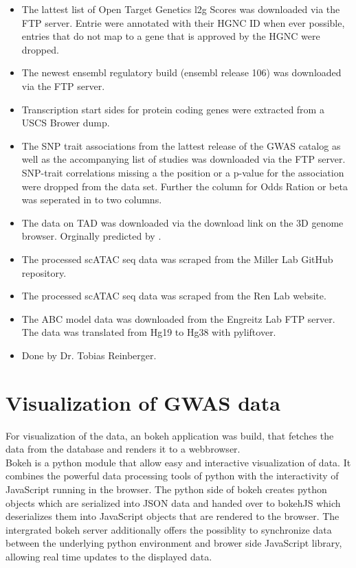 \begin{itemize}
    \item {} The lattest list of Open Target Genetics l2g Scores was downloaded via the FTP server. Entrie were annotated with their HGNC ID when ever possible, entries that do not map to a gene that is approved by the HGNC were dropped.
    \item {} The newest ensembl regulatory build (ensembl release 106) was downloaded via the FTP server.
    \item {} Transcription start sides for protein coding genes were extracted from a USCS Brower dump.
    \item {} The SNP trait associations from the lattest release of the GWAS catalog as well as the accompanying list of studies was downloaded via the FTP server. SNP-trait correlations missing a the position or a p-value for the association were dropped from the data set. Further the column for Odds Ration or beta was seperated in to two columns.
    \item {} The data on TAD was downloaded via the download link on the 3D genome browser. Orginally predicted by \cite{dixonTopologicalDomainsMammalian2012}.
    \item {} The processed scATAC seq data was scraped from the Miller Lab GitHub repository.
    \item {} The processed scATAC seq data was scraped from the Ren Lab website.
    \item {} The ABC model data was downloaded from the Engreitz Lab FTP server. The data was translated from Hg19 to Hg38 with pyliftover.
    \item {} Done by Dr. Tobias Reinberger.
\end{itemize}


\section{Visualization of GWAS data}
\label{sec:gwas_vis}
For visualization of the data, an bokeh application was build, that fetches the data from the database and renders it to a webbrowser.\\
Bokeh is a python module that allow easy and interactive visualization of data. It combines the powerful data processing tools of python with the interactivity of JavaScript running in the browser. The python side of bokeh creates python objects which are serialized into JSON data and handed over to bokehJS which deserializes them into JavaScript objects that are rendered to the browser. The intergrated bokeh server additionally offers the possiblity to synchronize data between the underlying python environment and brower side JavaScript library, allowing real time updates to the displayed data.

